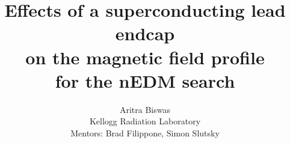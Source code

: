 \documentclass{beamer}
\newcommand{\bottomcite}{\let\thefootnote\relax\footnote}
\begin{document}

\title{Effects of a superconducting lead endcap\\ on the magnetic field profile \\ for the nEDM search}
\author{Aritra Biswas\\Kellogg Radiation Laboratory\\Mentors: Brad Filippone, Simon Slutsky}
\maketitle

%
%
%    
%
%
%
%
%
%    
%   
\end{document}
